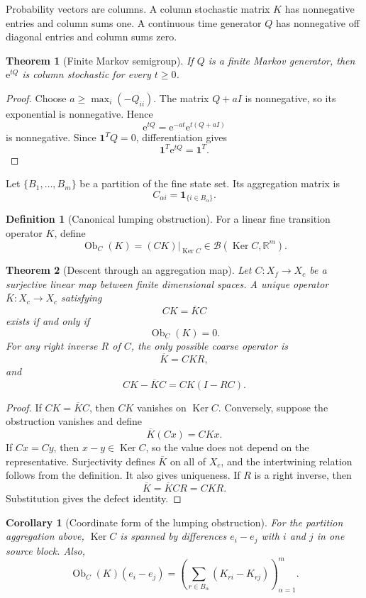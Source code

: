 \documentclass{aomart}
\newtheorem{theorem}{Theorem}[section]
\newtheorem{corollary}[corollary]{Corollary}
\theoremstyle{definition}
\newtheorem{definition}[definition]{Definition}
\theoremstyle{remark}
\newcommand{\RR}{\mathbb R}
\newcommand{\Ob}{\operatorname{Ob}}
\newcommand{\Ker}{\operatorname{Ker}}
\newcommand{\e}{\mathrm e}
\newcommand{\one}{\bm 1}
\begin{document}
Probability vectors are columns. A column stochastic matrix \(K\) has nonnegative entries and column sums one. A continuous time generator \(Q\) has nonnegative off diagonal entries and column sums zero.

\begin{theorem}[Finite Markov semigroup]\label{thm:finite_markov}
If \(Q\) is a finite Markov generator, then \(\e^{tQ}\) is column stochastic for every \(t\geq0\).
\end{theorem}

\begin{proof}
Choose \(a\geq\max_i(-Q_{ii})\). The matrix \(Q+aI\) is nonnegative, so its exponential is nonnegative. Hence
\[
\e^{tQ}=\e^{-at}\e^{t(Q+aI)}
\]
is nonnegative. Since \(\one^TQ=0\), differentiation gives
\[
\one^T\e^{tQ}=\one^T.
\]
\end{proof}

Let \(\{B_1,\ldots,B_m\}\) be a partition of the fine state set. Its aggregation matrix is
\[
C_{\alpha i}=\one_{\{i\in B_\alpha\}}.
\]

\begin{definition}[Canonical lumping obstruction]
For a linear fine transition operator \(K\), define
\[
\Ob_C(K)
=
(CK)|_{\Ker C}
\in
\mathcal B(\Ker C,\RR^m).
\]
\end{definition}

\begin{theorem}[Descent through an aggregation map]\label{thm:canonical_lumping_obstruction}
Let \(C:X_f\to X_c\) be a surjective linear map between finite dimensional spaces. A unique operator \(\overline K:X_c\to X_c\) satisfying
\[
CK=\overline KC
\]
exists if and only if
\[
\Ob_C(K)=0.
\]
For any right inverse \(R\) of \(C\), the only possible coarse operator is
\[
\overline K=CKR,
\]
and
\[
CK-\overline KC
=
CK(I-RC).
\]
\end{theorem}

\begin{proof}
If \(CK=\overline KC\), then \(CK\) vanishes on \(\Ker C\). Conversely, suppose the obstruction vanishes and define
\[
\overline K(Cx)=CKx.
\]
If \(Cx=Cy\), then \(x-y\in\Ker C\), so the value does not depend on the representative. Surjectivity defines \(\overline K\) on all of \(X_c\), and the intertwining relation follows from the definition. It also gives uniqueness. If \(R\) is a right inverse, then
\[
\overline K=\overline KCR=CKR.
\]
Substitution gives the defect identity.
\end{proof}

\begin{corollary}[Coordinate form of the lumping obstruction]\label{cor:lumping_obstruction_coordinates}
For the partition aggregation above, \(\Ker C\) is spanned by differences \(e_i-e_j\) with \(i\) and \(j\) in one source block. Also,
\[
\Ob_C(K)(e_i-e_j)
=
\left(
\sum_{r\in B_\alpha}(K_{ri}-K_{rj})
\right)_{\alpha=1}^m.
\]
\end{corollary}
\end{document}
